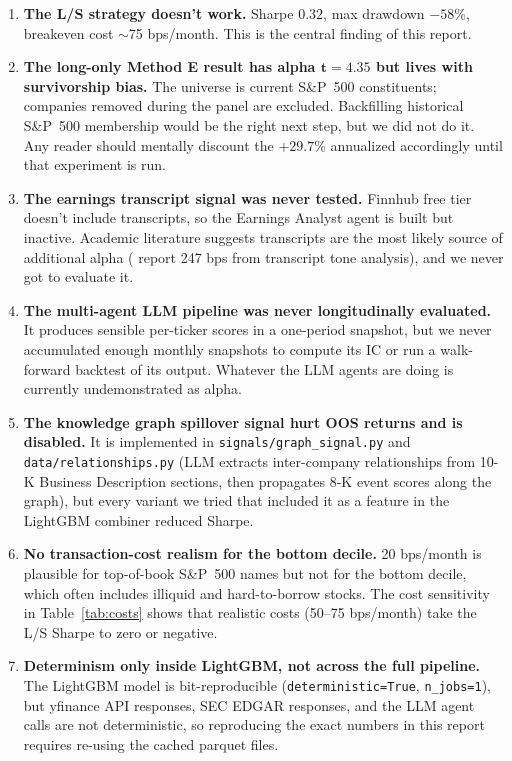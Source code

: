 \documentclass[11pt,a4paper]{article}
\begin{document}
\begin{enumerate}[noitemsep]
    \item \textbf{The L/S strategy doesn't work.} Sharpe $0.32$, max drawdown $-58\%$, breakeven cost $\sim$75 bps/month. This is the central finding of this report.
    \item \textbf{The long-only Method E result has alpha $\mathbf{t = 4.35}$ but lives with survivorship bias.} The universe is current S\&P~500 constituents; companies removed during the panel are excluded. Backfilling historical S\&P~500 membership would be the right next step, but we did not do it. Any reader should mentally discount the $+29.7\%$ annualized accordingly until that experiment is run.
    \item \textbf{The earnings transcript signal was never tested.} Finnhub free tier doesn't include transcripts, so the Earnings Analyst agent is built but inactive. Academic literature suggests transcripts are the most likely source of additional alpha (\citealt{kim2025earnings} report 247 bps from transcript tone analysis), and we never got to evaluate it.
    \item \textbf{The multi-agent LLM pipeline was never longitudinally evaluated.} It produces sensible per-ticker scores in a one-period snapshot, but we never accumulated enough monthly snapshots to compute its IC or run a walk-forward backtest of its output. Whatever the LLM agents are doing is currently undemonstrated as alpha.
    \item \textbf{The knowledge graph spillover signal hurt OOS returns and is disabled.} It is implemented in \texttt{signals/graph\_signal.py} and \texttt{data/relationships.py} (LLM extracts inter-company relationships from 10-K Business Description sections, then propagates 8-K event scores along the graph), but every variant we tried that included it as a feature in the LightGBM combiner reduced Sharpe.
    \item \textbf{No transaction-cost realism for the bottom decile.} 20 bps/month is plausible for top-of-book S\&P~500 names but not for the bottom decile, which often includes illiquid and hard-to-borrow stocks. The cost sensitivity in Table~\ref{tab:costs} shows that realistic costs (50--75 bps/month) take the L/S Sharpe to zero or negative.
    \item \textbf{Determinism only inside LightGBM, not across the full pipeline.} The LightGBM model is bit-reproducible (\texttt{deterministic=True}, \texttt{n\_jobs=1}), but yfinance API responses, SEC EDGAR responses, and the LLM agent calls are not deterministic, so reproducing the exact numbers in this report requires re-using the cached parquet files.
\end{enumerate}
\end{document}
